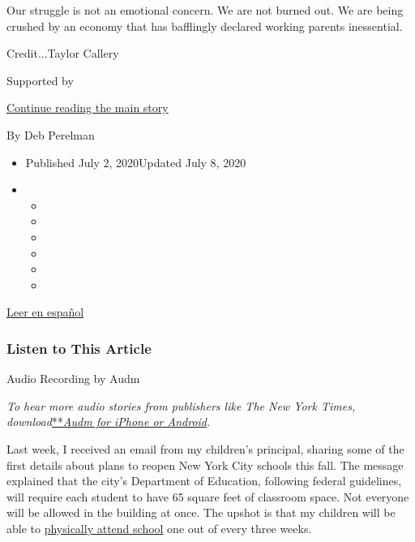 Our struggle is not an emotional concern. We are not burned out. We are
being crushed by an economy that has bafflingly declared working parents
inessential.

Credit...Taylor Callery

Supported by

\protect\hyperlink{after-sponsor}{Continue reading the main story}

By Deb Perelman

\begin{itemize}
\item
  Published July 2, 2020Updated July 8, 2020
\item
  \begin{itemize}
  \item
  \item
  \item
  \item
  \item
  \item
  \end{itemize}
\end{itemize}

\href{https://www.nytimes3xbfgragh.onion/es/2020/07/09/espanol/estilos-de-vida/trabajo-hijos-coronavirus.html}{Leer
en español}

\hypertarget{listen-to-this-article}{%
\subsubsection{Listen to This Article}\label{listen-to-this-article}}

Audio Recording by Audm

\emph{To hear more audio stories from publishers like The New York
Times,
download}\href{https://www.audm.com/?utm_source=nytmag\&utm_medium=embed\&utm_campaign=left_behind_draper}{**}\href{https://www.audm.com/?utm_source=nyt\&utm_medium=embed\&utm_campaign=covid_kid_job}{\emph{Audm
for iPhone or Android}}\emph{.}

Last week, I received an email from my children's principal, sharing
some of the first details about plans to reopen New York City schools
this fall. The message explained that the city's Department of
Education, following federal guidelines, will require each student to
have 65 square feet of classroom space. Not everyone will be allowed in
the building at once. The upshot is that my children will be able to
\href{https://www.nytimes3xbfgragh.onion/2020/06/26/us/coronavirus-schools-reopen-fall.html}{physically
attend school} one out of every three weeks.

